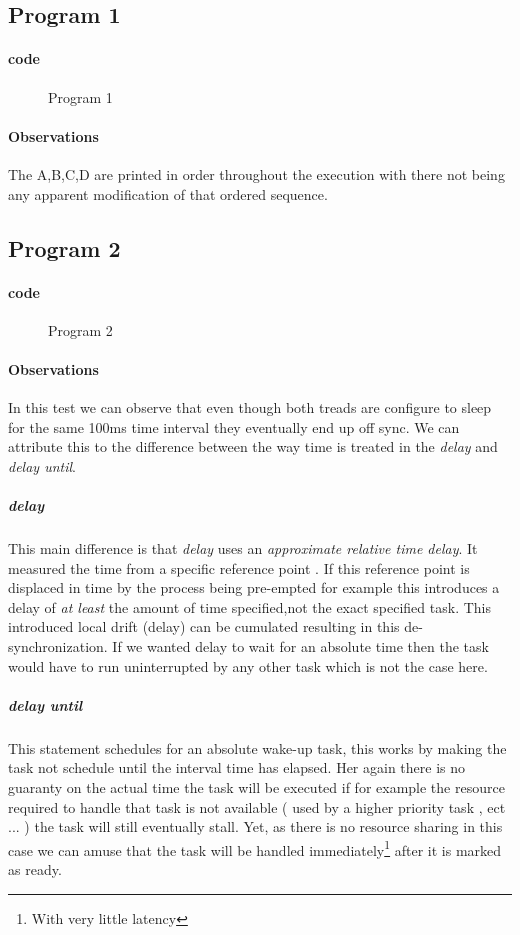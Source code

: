 \documentclass[10pt,a4paper]{article}
\begin{document}
\subsection{Program 1}
\paragraph{code}
\begin{figure}[H]
\begin{center}

\caption{Program 1}
\end{center}

\end{figure}

\paragraph{Observations}
The A,B,C,D are printed in order throughout the execution with there not being any apparent modification of that ordered sequence.
\subsection{Program 2}
\paragraph{code}
\begin{figure}[H]
\begin{center}

\caption{Program 2}
\end{center}
\end{figure}

\paragraph{Observations}
In this test we can observe that even though both treads are configure to sleep for the same 100ms time interval they eventually end up off sync. We can attribute this to the difference between the way time is treated in the \emph{delay} and \emph{delay until}.
\\
\subparagraph{delay}
This main difference is that \emph{delay} uses an \textit{approximate relative time delay}. It measured the time from a specific reference point . If this reference point is displaced in time by the process being pre-empted for example this  introduces a delay of \emph{at least} the amount of time specified,not the exact specified task. This introduced local drift (delay) can be cumulated resulting in this de-synchronization.
If we wanted delay to wait for an absolute time then the task would have to run uninterrupted by any other task which is not the case here.
\subparagraph{delay until}
This statement schedules for an absolute wake-up task, this works by making the task not schedule until the interval time has elapsed. Her again there is no guaranty on the actual time the task will be executed if for example the resource required to handle that task is not available ( used by a higher priority task , ect ... ) the task will still eventually stall. Yet, as there is no resource sharing in this case we can amuse that the task will be handled immediately\footnote{With very little latency} after it is marked as ready.
\end{document}
